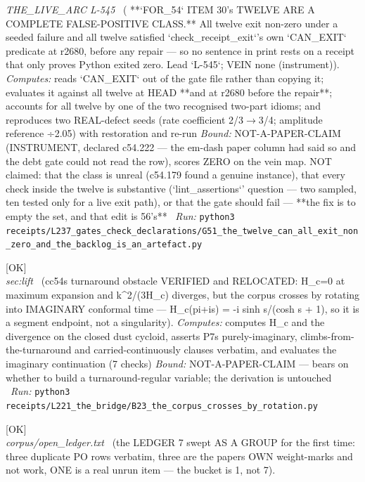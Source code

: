\begin{description}
\textit{THE\_LIVE\_ARC L-545} \ ( **`FOR\_54` ITEM 30's TWELVE ARE A COMPLETE FALSE-POSITIVE CLASS.** All twelve exit non-zero under a seeded failure and all twelve satisfied `check\_receipt\_exit`'s own `CAN\_EXIT` predicate at r2680, before any repair --- so no sentence in print rests on a receipt that only proves Python exited zero. Lead `L-545`; VEIN none (instrument)). 
\emph{Computes:} reads `CAN\_EXIT` out of the gate file rather than copying it; evaluates it against all twelve at HEAD **and at r2680 before the repair**; accounts for all twelve by one of the two recognised two-part idioms; and reproduces two REAL-defect seeds (rate coefficient 2/3\ensuremath{\to}3/4; amplitude reference ÷2.05) with restoration and re-run
 \emph{Bound:} NOT-A-PAPER-CLAIM (INSTRUMENT, declared c54.222 --- the em-dash paper column had said so and the debt gate could not read the row), scores ZERO on the vein map. NOT claimed: that the class is unreal (c54.179 found a genuine instance), that every check inside the twelve is substantive (`lint\_assertions`' question --- two sampled, ten tested only for a live exit path), or that the gate should fail --- **the fix is to empty the set, and that edit is 56's**
\ \emph{Run:} \texttt{python3 receipts/L237\_gates\_check\_declarations/G51\_the\_twelve\_can\_all\_exit\_non\_zero\_and\_the\_backlog\_is\_an\_artefact.py}
\item[\label{rcpt:B23_the_corpus_crosses_by_rotation}\texttt{B23\_the\_corpus\_crosses\_by\_rotation}]\hfill\textsf{[OK]}\\
\textit{sec:lift} \ (cc54s turnaround obstacle VERIFIED and RELOCATED: H\_c=0 at maximum expansion and k\textasciicircum{}2/(3H\_c) diverges, but the corpus crosses by rotating into IMAGINARY conformal time --- H\_c(pi+is) = -i sinh s/(cosh s + 1), so it is a segment endpoint, not a singularity). 
\emph{Computes:} computes H\_c and the divergence on the closed dust cycloid, asserts P7s purely-imaginary, climbs-from-the-turnaround and carried-continuously clauses verbatim, and evaluates the imaginary continuation (7 checks)
 \emph{Bound:} NOT-A-PAPER-CLAIM --- bears on whether to build a turnaround-regular variable; the derivation is untouched
\ \emph{Run:} \texttt{python3 receipts/L221\_the\_bridge/B23\_the\_corpus\_crosses\_by\_rotation.py}
\item[\label{rcpt:A4_the_ledger_seven_swept}\texttt{A4\_the\_ledger\_seven\_swept}]\hfill\textsf{[OK]}\\
\textit{corpus/open\_ledger.txt} \ (the LEDGER 7 swept AS A GROUP for the first time: three duplicate PO rows verbatim, three are the papers OWN weight-marks and not work, ONE is a real unrun item --- the bucket is 1, not 7). 

\end{description}
